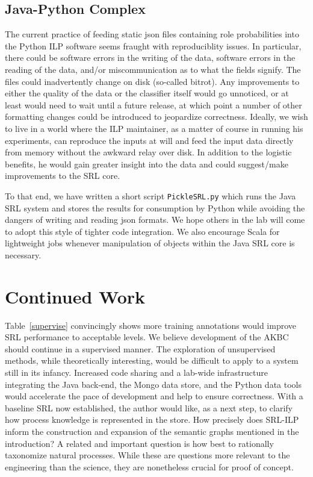 \documentclass{article} %
\begin{document}
\subsection{Java-Python Complex}
The current practice of feeding static json files containing role probabilities into the Python ILP software seems fraught with reproduciblity issues.  In particular, there could be software errors in the writing of the data, software errors in the reading of the data, and/or miscommunication as to what the fields signify.  The files could inadvertently change on disk (so-called bitrot).  Any improvements to either the quality of the data or the classifier itself would go unnoticed, or at least would need to wait until a future release, at which point a number of other formatting changes could be introduced to jeopardize correctness.  Ideally, we wish to live in a world where the ILP maintainer, as a matter of course in running his experiments, can reproduce the inputs at will and feed the input data directly from memory without the awkward relay over disk.  In addition to the logistic benefits, he would gain greater insight into the data and could suggest/make improvements to the SRL core.

To that end, we have written a short script {\tt PickleSRL.py} which runs the Java SRL system and stores the results for consumption by Python while avoiding the dangers of writing and reading json formats.  We hope others in the lab will come to adopt this style of tighter code integration.  We also encourage Scala for lightweight jobs whenever manipulation of objects within the Java SRL core is necessary.

\section{Continued Work}
Table~\ref{supervise} convincingly shows more training annotations would improve SRL performance to acceptable levels.  We believe development of the AKBC should continue in a supervised manner.  The exploration of unsupervised methods, while theoretically interesting, would be difficult to apply to a system still in its infancy.  Increased code sharing and a lab-wide infrastructure integrating the Java back-end, the Mongo data store, and the Python data tools would accelerate the pace of development and help to ensure correctness.  With a baseline SRL now established, the author would like, as a next step, to clarify how process knowledge is represented in the store.  How precisely does SRL-ILP inform the construction and expansion of the semantic graphs mentioned in the introduction?  A related and important question is how best to rationally taxonomize natural processes. While these are questions more relevant to the engineering than the science, they are nonetheless crucial for proof of concept.

\small{
\printbibliography
}
\end{document}
